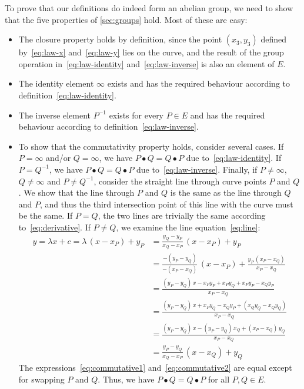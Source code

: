 \documentclass{article}
\begin{document}
To prove that our definitions do indeed form an abelian group, we need to show that the five properties of \autoref{sec:groups} hold.
Most of these are easy:
\begin{itemize}
\item The closure property holds by definition, since the point $(x_3, y_3)$ defined by~\eqref{eq:law-x} and~\eqref{eq:law-y} lies on the curve, and the result of the group operation in~\eqref{eq:law-identity} and~\eqref{eq:law-inverse} is also an element of $E$.
\item The identity element $\infty$ exists and has the required behaviour according to definition~\eqref{eq:law-identity}.
\item The inverse element $P^{-1}$ exists for every $P \in E$ and has the required behaviour according to definition~\eqref{eq:law-inverse}.
\item To show that the commutativity property holds, consider several cases.
If $P = \infty$ and/or $Q = \infty$, we have $P \bullet Q = Q \bullet P$ due to~\eqref{eq:law-identity}.
If $P = Q^{-1}$, we have $P \bullet Q = Q \bullet P$ due to~\eqref{eq:law-inverse}.
Finally, if $P \neq \infty$, $Q \neq \infty$ and $P \neq Q^{-1}$, consider the straight line through curve points $P$ and $Q$.
We show that the line through $P$ and $Q$ is the same as the line through $Q$ and $P$, and thus the third intersection point of this line with the curve must be the same.
If $P=Q$, the two lines are trivially the same according to~\eqref{eq:derivative}.
If $P \neq Q$, we examine the line equation~\eqref{eq:line}:
\begin{align}
y = \lambda x + c = \lambda\,(x - x_P) + y_P &= \frac{y_Q - y_P}{x_Q - x_P}\,(x - x_P) + y_P \label{eq:commutative1}\\[5pt]
& = \frac{-(y_P - y_Q)}{-(x_P - x_Q)}\,(x - x_P) + \frac{y_P\,(x_P - x_Q)}{x_P - x_Q} \nonumber\\[5pt]
& = \frac{(y_P - y_Q)\,x - x_P y_P + x_P y_Q + x_P y_P - x_Q y_P}{x_P - x_Q} \nonumber\\[5pt]
& = \frac{(y_P - y_Q)\,x + x_P y_Q - x_Q y_P + (x_Q y_Q - x_Q y_Q)}{x_P - x_Q} \nonumber\\[5pt]
& = \frac{(y_P - y_Q)\,x - (y_P - y_Q)\,x_Q + (x_P - x_Q)\,y_Q}{x_P - x_Q} \nonumber\\[5pt]
& = \frac{y_P - y_Q}{x_Q - x_P}\,(x - x_Q) + y_Q \label{eq:commutative2}
\end{align}
The expressions~\eqref{eq:commutative1} and~\eqref{eq:commutative2} are equal except for swapping $P$ and $Q$.
Thus, we have $P \bullet Q = Q \bullet P$ for all $P, Q \in E$.
\end{itemize}
\end{document}
